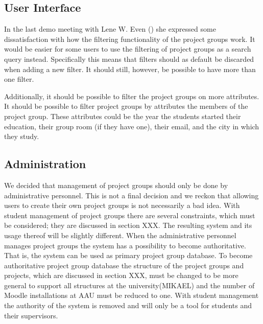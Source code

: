 \subsection{User Interface}
In the last demo meeting with Lene W. Even () she expressed some dissatisfaction with how the filtering functionality of the project groups work.
It would be easier for some users to use the filtering of project groups as a search query instead.
Specifically this means that filters should as default be discarded when adding a new filter.
It should still, however, be possible to have more than one filter.

Additionally, it should be possible to filter the project groups on more attributes.
It should be possible to filter project groups by attributes the members of the project group.
These attributes could be the year the students started their education, their group room (if they have one), their email, and the city in which they study.


\subsection{Administration}
We decided that management of project groups should only be done by administrative personnel. 
This is not a final decision and we reckon that allowing users to create their own project groups is not necessarily a bad idea. 
With student management of project groups there are several constraints, which must be considered; they are discussed in section XXX. 
The resulting system and its usage thereof will be slightly different.
When the administrative personnel manages project groups the system has a possibility to become authoritative.
That is, the system can be used as primary project group database. 
To become authoritative project group database the structure of the project groups and projects, which are discussed in section XXX, must be changed to be more general to support all structures at the university(MIKAEL) and the number of Moodle installations at AAU must be reduced to one. 
With student management the authority of the system is removed and will only be a tool for students and their supervisors.




